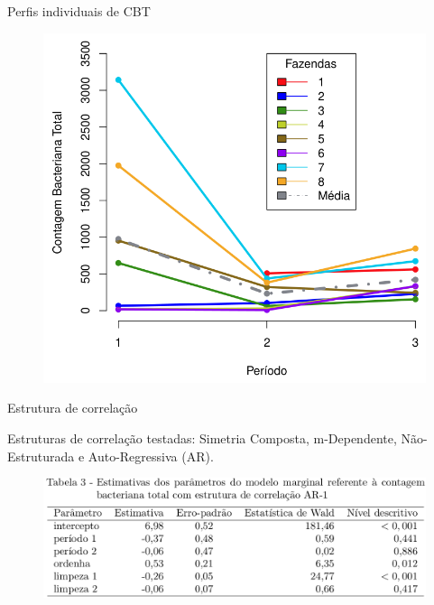 \documentclass{beamer}
\begin{document}
    \begin{frame}{Perfis individuais de CBT}
        \begin{figure}[!h]
            \centering
            \includegraphics[scale=0.25]{long_graf01.png}
            \label{Rotulo}
        \end{figure}
    \end{frame}

   \begin{frame}{Estrutura de correlação}
        \begin{block}{}
          Estruturas de correlação testadas: Simetria Composta, m-Dependente, Não-Estruturada e Auto-Regressiva (AR).
        \end{block}
        
        \begin{figure}[!h]
            \centering
            \includegraphics[scale=0.29]{long_tab03.png}
            \label{Rotulo}
        \end{figure}
 
 \end{frame}
\end{document}
